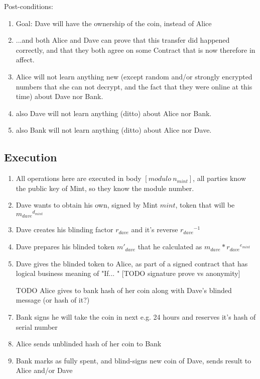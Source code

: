 \documentclass[a4paper,11pt]{article}
\begin{document}
Post-conditions:  
\begin{enumerate}
  \item Goal: Dave will have the ownership of the coin, instead of Alice
  \item ...and both Alice and Dave can prove that this transfer did happened correctly, and that they both agree on some Contract that is now therefore in affect.
  \item Alice will not learn anything new (except random and/or strongly encrypted numbers that she can not decrypt, and the fact that they were online at this time) about Dave nor Bank.
  \item also Dave will not learn anything (ditto) about Alice nor Bank.
  \item also Bank will not learn anything (ditto) about Alice nor Dave.
\end{enumerate}

\subsection{Execution}

\begin{enumerate}
  \item All operations here are executed in body $[modulo\ n_{mint}]$, all parties know the public key of Mint, so they know the module number.
  \item Dave wants to obtain his own, signed by Mint $mint$, token that will be ${m_{dave}}^{d_{mint}}$
  \item Dave creates his blinding factor $r_{dave}$ and it's reverse ${r_{dave}}^{-1}$
  \item Dave prepares his blinded token ${m'}_{dave}$ that he calculated as ${m_{dave}}*{r_{dave}}^{e_{mint}}$
  \item Dave gives the blinded token to Alice, as part of a signed contract that has logical business meaning of "If... " [TODO signature prove vs anonymity]
  \item [TODO] Alice gives to bank hash of her coin along with Dave's blinded message (or hash of it?)
  \item Bank signs he will take the coin in next e.g. 24 hours and reserves it's hash of serial number
  \item Alice sends unblinded hash of her coin to Bank
  \item Bank marks as fully spent, and blind-signs new coin of Dave, sends result to Alice and/or Dave
\end{enumerate}
\end{document}
